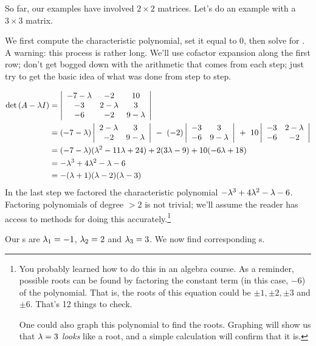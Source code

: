 So far, our examples have involved $2\times 2$ matrices. Let's do an example with a $3\times 3$ matrix.\\

{We first compute the characteristic polynomial, set it equal to 0, then solve for \lda. A warning: this process is rather long. We'll use cofactor expansion along the first row; don't get bogged down with the arithmetic that comes from each step; just try to get the basic idea of what was done from step to step.



\begin{align*}
\det{\tta-\lda\tti} &= \bdt{ccc} -7-\lda & -2 & 10 \\-3 & 2-\lda & 3\\ -6 & -2 & 9-\lda \edt \\
										&= (-7-\lda)\bdt{cc}2-\lda & 3\\-2 & 9-\lda\edt\ -\ (-2)\bdt{cc} -3&3\\-6 & 9-\lda \edt\ +\ 10\bdt{cc} -3&2-\lda \\-6 & -2 \edt \\
										&= (-7-\lda)(\lda^2-11\lda + 24) + 2(3\lda-9)+10(-6\lda+18)\\
										&= -\lda^3+4\lda^2-\lda -6\\
										&= -(\lda + 1)(\lda-2)(\lda-3)
\end{align*}
\drawexampleline%
In the last step we factored the characteristic polynomial $-\lda^3+4\lda^2-\lda -6$. Factoring polynomials of degree $>2$ is not trivial; we'll assume the reader has access to methods for doing this accurately.\footnote{You probably learned how to do this in an algebra course. As a reminder, possible roots can be found by factoring the constant term (in this case, $-6$) of the polynomial. That is, the roots of this equation could be $\pm 1, \pm 2, \pm 3$ and $\pm 6$. That's 12 things to check.

One could also graph this polynomial to find the roots. Graphing will show us that $\lda = 3$ \textit{looks} like a root, and a simple calculation will confirm that it is.}

Our \el s are $\lda_1 = -1$, $\lda_2 = 2$ and $\lda_3 = 3$. We now find corresponding \ev s.\\

}
